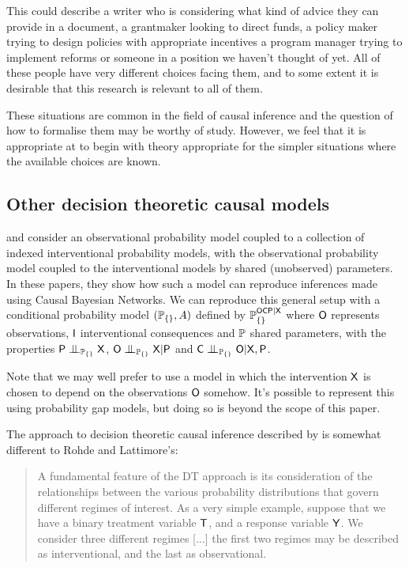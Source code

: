 This could describe a writer who is considering what kind of advice they can provide in a document, a grantmaker looking to direct funds, a policy maker trying to design policies with appropriate incentives a program manager trying to implement reforms or someone in a position we haven't thought of yet. All of these people have very different choices facing them, and to some extent it is desirable that this research is relevant to all of them.

These situations are common in the field of causal inference and the question of how to formalise them may be worthy of study. However, we feel that it is appropriate at to begin with theory appropriate for the simpler situations where the available choices are known.

\subsection{Other decision theoretic causal models}

\citet{lattimore_causal_2019} and \citet{lattimore_replacing_2019} consider an observational probability model coupled to a collection of indexed interventional probability models, with the observational probability model coupled to the interventional models by shared (unobserved) parameters. In these papers, they show how such a model can reproduce inferences made using Causal Bayesian Networks. We can reproduce this general setup with a conditional probability model $(\mathbb{P}_{\{\}},A)$ defined by $\mathbb{P}_{\{\}}^{\mathsf{OCP}|\mathsf{X}}$ where $\mathsf{O}$ represents observations, $\mathsf{I}$ interventional consequences and $\mathbb{P}$ shared parameters, with the properties $\RV{P}\CI_{\prob{P}_{\{\}}} \RV{X}$, $\RV{O}\CI_{\prob{P}_{\{\}}} \RV{X}|\RV{P}$ and $\RV{C}\CI_{\prob{P}_{\{\}}} \RV{O}|\RV{X},\RV{P}$.

Note that we may well prefer to use a model in which the intervention $\mathsf{X}$ is chosen to depend on the observations $\mathsf{O}$ somehow. It's possible to represent this using probability gap models, but doing so is beyond the scope of this paper.

The approach to decision theoretic causal inference described by \citet{dawid_decision-theoretic_2020} is somewhat different to Rohde and Lattimore's:

\begin{quote}
A fundamental feature of the DT approach is its consideration of the relationships between the various probability distributions that govern different regimes of interest. As a very simple example, suppose that we have a binary treatment variable $\mathsf{T}$, and a response variable $\mathsf{Y}$. We consider three different regimes [...] the first two regimes may be described as interventional, and the last as observational.
\end{quote}

